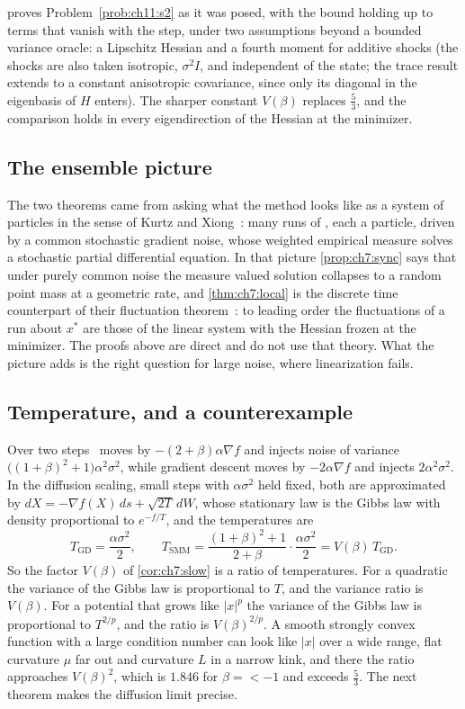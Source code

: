  proves Problem~\ref{prob:ch11:s2} as it was posed, with the bound holding up to terms that vanish with the step, under two assumptions beyond a bounded variance oracle: a Lipschitz Hessian and a fourth moment for additive shocks (the shocks are also taken isotropic, $\sigma^2I$, and independent of the state; the trace result extends to a constant anisotropic covariance, since only its diagonal in the eigenbasis of $H$ enters). The sharper constant $V(\beta)$ replaces $\tfrac53$, and the comparison holds in every eigendirection of the Hessian at the minimizer.

\subsection{The ensemble picture}
The two theorems came from asking what the method looks like as a system of particles in the sense of Kurtz and Xiong~\cite{kurtz1999}: many runs of \smmdet, each a particle, driven by a common stochastic gradient noise, whose weighted empirical measure solves a stochastic partial differential equation. In that picture \cref{prop:ch7:sync} says that under purely common noise the measure valued solution collapses to a random point mass at a geometric rate, and \cref{thm:ch7:local} is the discrete time counterpart of their fluctuation theorem~\cite{kurtz2004}: to leading order the fluctuations of a run about $x^\ast$ are those of the linear system with the Hessian frozen at the minimizer. The proofs above are direct and do not use that theory. What the picture adds is the right question for large noise, where linearization fails.

\subsection{Temperature, and a counterexample}
Over two steps \smmdet\ moves by $-(2+\beta)\alpha\nabla f$ and injects noise of variance $\bigl((1+\beta)^2+1\bigr)\alpha^2\sigma^2$, while gradient descent moves by $-2\alpha\nabla f$ and injects $2\alpha^2\sigma^2$. In the diffusion scaling, small steps with $\alpha\sigma^2$ held fixed, both are approximated by $dX=-\nabla f(X)\,ds+\sqrt{2T}\,dW$, whose stationary law is the Gibbs law with density proportional to $e^{-f/T}$, and the temperatures are
\[
  T_{\mathrm{GD}}=\frac{\alpha\sigma^2}{2},\qquad T_{\mathrm{SMM}}=\frac{(1+\beta)^2+1}{2+\beta}\cdot\frac{\alpha\sigma^2}{2}=V(\beta)\,T_{\mathrm{GD}} .
\]
So the factor $V(\beta)$ of \cref{cor:ch7:slow} is a ratio of temperatures. For a quadratic the variance of the Gibbs law is proportional to $T$, and the variance ratio is $V(\beta)$. For a potential that grows like $|x|^p$ the variance of the Gibbs law is proportional to $T^{2/p}$, and the ratio is $V(\beta)^{2/p}$. A smooth strongly convex function with a large condition number can look like $|x|$ over a wide range, flat curvature $\mu$ far out and curvature $L$ in a narrow kink, and there the ratio approaches $V(\beta)^2$, which is $1.846$ for $\beta=\lt-1$ and exceeds $\tfrac53$. The next theorem makes the diffusion limit precise.

